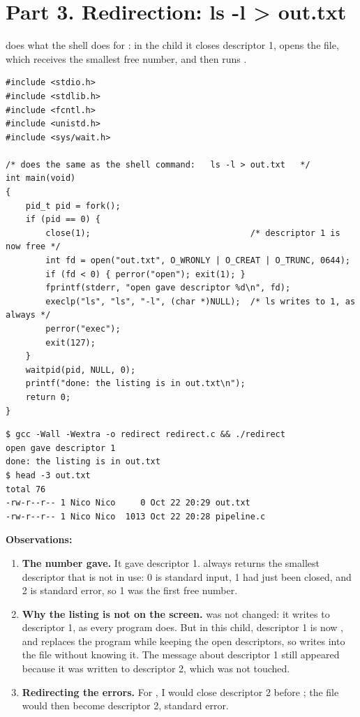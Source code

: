 \documentclass[11pt,a4paper]{article}
\begin{document}
\section{Part 3. Redirection: ls -l > out.txt}

 does what the shell does for : in the child it closes
descriptor 1, opens the file, which receives the smallest free number, and then runs .

\begin{lstlisting}[style=ccode,caption={redirect.c}]
#include <stdio.h>
#include <stdlib.h>
#include <fcntl.h>
#include <unistd.h>
#include <sys/wait.h>

/* does the same as the shell command:   ls -l > out.txt   */
int main(void)
{
    pid_t pid = fork();
    if (pid == 0) {
        close(1);                                /* descriptor 1 is now free */
        int fd = open("out.txt", O_WRONLY | O_CREAT | O_TRUNC, 0644);
        if (fd < 0) { perror("open"); exit(1); }
        fprintf(stderr, "open gave descriptor %d\n", fd);
        execlp("ls", "ls", "-l", (char *)NULL);  /* ls writes to 1, as always */
        perror("exec");
        exit(127);
    }
    waitpid(pid, NULL, 0);
    printf("done: the listing is in out.txt\n");
    return 0;
}
\end{lstlisting}

\begin{lstlisting}[caption={redirect and the content of out.txt}]
$ gcc -Wall -Wextra -o redirect redirect.c && ./redirect
open gave descriptor 1
done: the listing is in out.txt
$ head -3 out.txt
total 76
-rw-r--r-- 1 Nico Nico     0 Oct 22 20:29 out.txt
-rw-r--r-- 1 Nico Nico  1013 Oct 22 20:28 pipeline.c
\end{lstlisting}

\textbf{Observations:}
\begin{enumerate}
  \item \textbf{The number  gave.} It gave descriptor 1.  always returns
  the smallest descriptor that is not in use: 0 is standard input, 1 had just been closed, and 2
  is standard error, so 1 was the first free number.
  \item \textbf{Why the listing is not on the screen.}  was not changed: it writes to
  descriptor 1, as every program does. But in this child, descriptor 1 is now ,
  and  replaces the program while keeping the open descriptors, so  writes
  into the file without knowing it. The message about descriptor 1 still appeared because it was
  written to descriptor 2, which was not touched.
  \item \textbf{Redirecting the errors.} For , I would close descriptor 2
  before ; the file would then become descriptor 2, standard error.
\end{enumerate}
\end{document}
